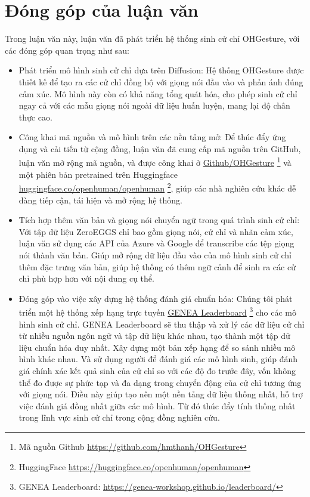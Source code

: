 \section{Đóng góp của luận văn}
\label{sec:contribution}

Trong luận văn này, luận văn đã phát triển hệ thống sinh cử chỉ OHGesture, với các đóng góp quan trọng như sau:

\begin{itemize}
	\item Phát triển mô hình sinh cử chỉ dựa trên Diffusion: Hệ thống OHGesture được thiết kế để tạo ra các cử chỉ đồng bộ với giọng nói đầu vào và phản ánh đúng cảm xúc. Mô hình này còn có khả năng tổng quát hóa, cho phép sinh cử chỉ ngay cả với các mẫu giọng nói ngoài dữ liệu huấn luyện, mang lại độ chân thực cao.
	
	\item Công khai mã nguồn và mô hình trên các nền tảng mở: Để thúc đẩy ứng dụng và cải tiến từ cộng đồng, luận văn đã cung cấp mã nguồn trên GitHub, luận văn mở rộng mã nguồn, và được công khai ở \hyperlink{https://github.com/hmthanh/OHGesture}{Github/OHGesture} \footnote{Mã nguồn Github \url{https://github.com/hmthanh/OHGesture}} và một phiên bản pretrained trên Huggingface \hyperlink{https://huggingface.co/openhuman/openhuman}{huggingface.co/openhuman/openhuman} \footnote{HuggingFace \url{https://huggingface.co/openhuman/openhuman}}, giúp các nhà nghiên cứu khác dễ dàng tiếp cận, tái hiện và mở rộng hệ thống.
	
	\item Tích hợp thêm văn bản và giọng nói chuyển ngữ trong quá trình sinh cử chỉ: Với tập dữ liệu ZeroEGGS chỉ bao gồm giọng nói, cử chỉ và nhãn cảm xúc, luận văn sử dụng các API của Azure và Google để transcribe các tệp giọng nói thành văn bản. Giúp mở rộng dữ liệu đầu vào của mô hình sinh cử chỉ thêm đặc trưng văn bản, giúp hệ thống có thêm ngữ cảnh để sinh ra các cử chỉ phù hợp hơn với nội dung cụ thể.
	
	\item Đóng góp vào việc xây dựng hệ thống đánh giá chuẩn hóa: Chúng tôi phát triển một hệ thống xếp hạng trực tuyến \hyperlink{https://genea-workshop.github.io/leaderboard/}{GENEA Leaderboard} \footnote{GENEA Leaderboard: \url{https://genea-workshop.github.io/leaderboard/}} \cite{nagy2024towards} cho các mô hình sinh cử chỉ. GENEA Leaderboard sẽ thu thập và xử lý các dữ liệu cử chỉ từ nhiều nguồn ngôn ngữ và tập dữ liệu khác nhau, tạo thành một tập dữ liệu chuẩn hóa duy nhất. Xây dựng một bản xếp hạng để so sánh nhiều mô hình khác nhau. Và sử dụng người để đánh giá các mô hình sinh, giúp đánh giá chính xác kết quả sinh của cử chỉ so với các độ đo trước đây, vốn không thể đo được sự phức tạp và đa dạng trong chuyển động của cử chỉ tương ứng với giọng nói. Điều này giúp tạo nên một nền tảng dữ liệu thống nhất, hỗ trợ việc đánh giá đồng nhất giữa các mô hình. Từ đó thúc đẩy tính thống nhất trong lĩnh vực sinh cử chỉ trong cộng đồng nghiên cứu.
	

\end{itemize}
